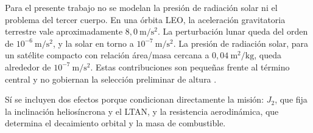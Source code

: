 Para el presente trabajo no se modelan la presión de radiación solar ni el problema del tercer cuerpo. En una órbita LEO, la aceleración gravitatoria terrestre vale aproximadamente \(8{,}0\ \mathrm{m/s^2}\). La perturbación lunar queda del orden de \(10^{-6}\ \mathrm{m/s^2}\), y la solar en torno a \(10^{-7}\ \mathrm{m/s^2}\). La presión de radiación solar, para un satélite compacto con relación área/masa cercana a \(0{,}04\ \mathrm{m^2/kg}\), queda alrededor de \(10^{-7}\ \mathrm{m/s^2}\). Estas contribuciones son pequeñas frente al término central y no gobiernan la selección preliminar de altura \cite{vallado2013fundamentals}.

Sí se incluyen dos efectos porque condicionan directamente la misión: \(J_2\), que fija la inclinación heliosíncrona y el LTAN, y la resistencia aerodinámica, que determina el decaimiento orbital y la masa de combustible.
